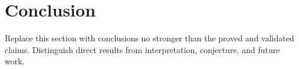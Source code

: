 \section{Conclusion}

Replace this section with conclusions no stronger than the proved and validated claims. Distinguish direct results from interpretation, conjecture, and future work.

